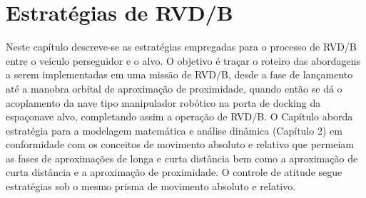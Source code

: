 
\chapter{Estratégias de RVD/B}
\label{sec:cap2_estrategias_rvdb}

Neste capítulo descreve-se as estratégias empregadas para o processo de RVD/B entre o veículo perseguidor e o alvo.
O objetivo é traçar o roteiro das abordagens a serem implementadas em uma missão de RVD/B, desde a fase de lançamento até  a manobra orbital de aproximação de proximidade, quando então se dá o acoplamento da nave tipo manipulador robótico na porta de docking da espaçonave alvo, completando assim a operação de RVD/B.
O Capítulo aborda estratégia para a modelagem matemática e análise dinâmica (Capítulo 2) em conformidade com os conceitos de movimento absoluto e relativo que permeiam as fases de aproximações de longa e curta distância bem como a aproximação de curta distância e a aproximação de proximidade. O controle de atitude segue estratégias sob o mesmo prisma de movimento absoluto e relativo.


